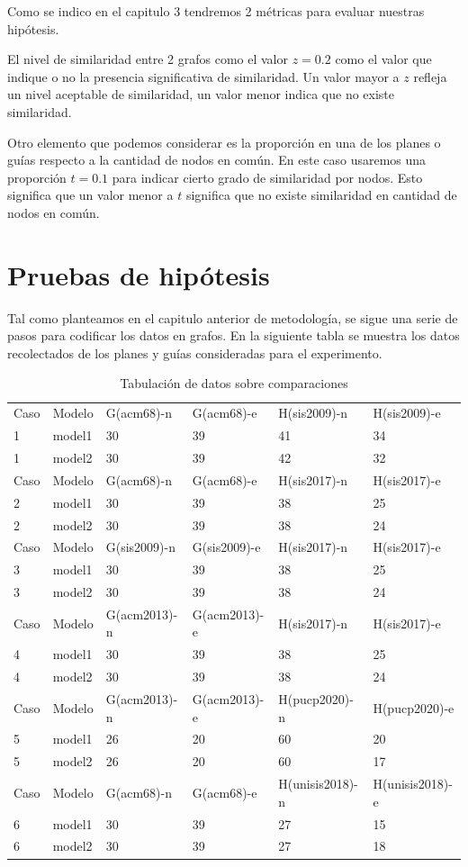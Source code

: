	Como se indico en el capitulo 3 tendremos 2 métricas para evaluar nuestras hipótesis. 

	El nivel de similaridad entre 2 grafos como el valor $ z = 0.2 $ como el valor que indique o no la presencia significativa de similaridad. Un valor mayor a $z$ refleja un nivel aceptable de similaridad, un valor menor indica que no existe similaridad.

	Otro elemento que podemos considerar es la proporción en una de los planes o guías respecto a la cantidad de nodos en común. En este caso usaremos una proporción $ t = 0.1$ para indicar cierto grado de similaridad por nodos. Esto significa que un valor menor a $t$ significa que no existe similaridad en cantidad de nodos en común.

\section{Pruebas de hipótesis}


Tal como planteamos en el capitulo anterior de metodología, se sigue una serie de pasos para codificar los datos en grafos. En la siguiente tabla se muestra los datos recolectados de los planes y guías consideradas para el experimento.



\begin{table}[H]
\centering
\caption{Tabulación de datos sobre comparaciones}
\begin{tabular}[t]{|l|l|l|l|l|l|}
\hline
Caso & Modelo & G(acm68)-n & G(acm68)-e & H(sis2009)-n & H(sis2009)-e\\
1&model1&30&39&41&34\\
\hline
1&model2&30&39&42&32\\
\hline
Caso & Modelo & G(acm68)-n & G(acm68)-e & H(sis2017)-n & H(sis2017)-e\\
2&model1&30&39&38&25\\
\hline
2&model2&30&39&38&24\\
\hline
Caso & Modelo & G(sis2009)-n & G(sis2009)-e & H(sis2017)-n & H(sis2017)-e\\
3&model1&30&39&38&25\\
\hline
3&model2&30&39&38&24\\
\hline
Caso & Modelo & G(acm2013)-n & G(acm2013)-e & H(sis2017)-n & H(sis2017)-e\\
4&model1&30&39&38&25\\
\hline
4&model2&30&39&38&24\\
\hline
Caso & Modelo & G(acm2013)-n & G(acm2013)-e & H(pucp2020)-n & H(pucp2020)-e\\
5&model1&26&20&60&20\\
\hline
5&model2&26&20&60&17\\
\hline
Caso & Modelo & G(acm68)-n & G(acm68)-e & H(unisis2018)-n & H(unisis2018)-e\\
6&model1&30&39&27&15\\
\hline
6&model2&30&39&27&18\\
\hline
\end{tabular}
\label{tab:tabcomparaciones}
\end{table}


